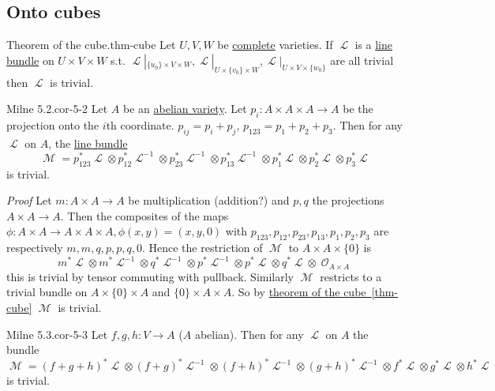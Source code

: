 \documentclass[10pt,]{book}
\makeatletter
\renewcommand*{\proofname}{Proof}
\renewenvironment{proof}[1][\proofname]{\par
  \pushQED{\qed}%
  \normalfont \topsep6\p@\@plus6\p@\relax
  \trivlist
  \item\relax
    {\itshape
    #1\@addpunct{.}}\hspace\labelsep\ignorespaces
}{%
  \popQED\endtrivlist\@endpefalse
}
\numberwithin{equation}{section}
\newcommand{\sheaf}[1]{\operatorname{\mathcal{#1}}}
\makeatother
\begin{document}
\subsection[{Onto cubes}]{Onto cubes}\label{sec-onto-cubes}
\begin{theorem}{Theorem of the cube.}{}{thm-cube}%
\hypertarget{p-122}{}%
Let \(U,V,W\) be \hyperref[def-abelian-complete-var]{complete} varieties. If \(\sheaf L \) is a \hyperref[def-line-bundle]{line bundle} on \(U\times V\times W\) s.t. \(\sheaf L|_{\{u_0\}\times V\times W},\sheaf L|_{U\times \{v_0\}\times W}, \sheaf L|_{U\times V\times \{w_0\}}\) are all trivial then \(\sheaf L\) is trivial.%
\end{theorem}
\begin{corollary}{Milne 5.2.}{}{cor-5-2}%
\hypertarget{p-123}{}%
Let \(A\) be an \hyperref[def-buntes-abvar]{abelian variety}. Let \(p_i\colon A\times A\times A \to A\) be the projection onto the \(i\)th coordinate. \(p_{ij} = p_i+p_j\), \(p_{123} = p_1+p_2+p_3\). Then for any \(\sheaf L\) on \(A\), the \hyperref[def-line-bundle]{line bundle}%
\begin{equation*}
\sheaf M  = p_{123}^*\sheaf L \otimes p_{12}^*\sheaf L^{-1}\otimes p_{23}^*\sheaf L^{-1}\otimes p_{13}^*\sheaf L^{-1} \otimes p_1^*\sheaf L \otimes p_2^*\sheaf L \otimes p_3^*\sheaf L
\end{equation*}
is trivial.%
\end{corollary}
\begin{proof}\hypertarget{proof-19}{}
\hypertarget{p-124}{}%
Let  \(m \colon A\times A \to A\) be multiplication (addition?) and \(p,q\) the projections \(A\times A \to A\). Then the composites of the maps \(\phi\colon A\times A \to A \times A \times A, \phi(x,y) = (x,y,0)\) with \(p_{123}, p_{12}, p_{23}, p_{13}, p_1, p_2, p_3\) are respectively \(m,m,q, p, p, q, 0\). Hence the restriction of \(\sheaf M\) to \(A \times A \times \{0\}\) is%
\begin{equation*}
m^* \sheaf L \otimes m^* \sheaf L^{-1} \otimes q^* \sheaf L^{-1} \otimes p^*\sheaf L^{-1} \otimes p^*\sheaf L \otimes q^*\sheaf L \otimes \sheaf O_{A\times A}
\end{equation*}
this is trivial by tensor commuting with pullback. Similarly \(\sheaf M\) restricts to a trivial bundle on \(A\times \{0\} \times A\) and \(\{0\}\times A \times A\). So by \hyperref[thm-cube]{theorem of the cube~\ref{thm-cube}} \(\sheaf M\) is trivial.%
\end{proof}
\begin{corollary}{Milne 5.3.}{}{cor-5-3}%
\hypertarget{p-125}{}%
Let \(f,g, h\colon V \to A\) (\(A\) abelian). Then for any \(\sheaf L\) on \(A\) the bundle%
\begin{equation*}
\sheaf M  = (f+g+h)^*\sheaf L \otimes (f+g)^*\sheaf L^{-1}\otimes (f+h)^*\sheaf L^{-1}\otimes (g+h)^*\sheaf L^{-1} \otimes   f^*\sheaf L \otimes   g^*\sheaf L \otimes   h^*\sheaf L
\end{equation*}
is trivial.%
\end{corollary}
\end{document}
